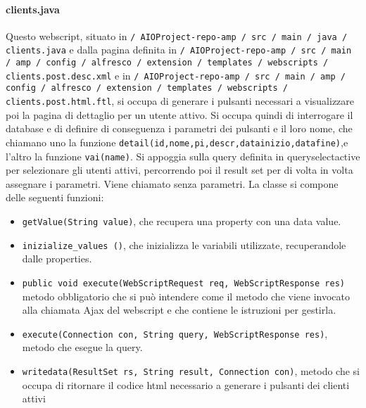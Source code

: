 \paragraph{clients.java}
Questo webscript, situato in \texttt{/ AIOProject-repo-amp / src / main / java / clients.java} e dalla pagina definita in \texttt{/ AIOProject-repo-amp / src / main / amp / config / alfresco / extension / templates / webscripts / clients.post.desc.xml} e in \texttt{/ AIOProject-repo-amp / src / main / amp / config / alfresco / extension / templates / webscripts / clients.post.html.ftl}, si occupa di generare i pulsanti necessari a visualizzare poi la pagina di dettaglio per un utente attivo. Si occupa quindi di interrogare il database e di definire di conseguenza i parametri dei pulsanti e il loro nome, che chiamano uno la funzione \texttt{detail(id,nome,pi,descr,datainizio,datafine)},e l’altro la funzione \texttt{vai(name)}. Si appoggia sulla query definita in queryselectactive per selezionare gli utenti attivi, percorrendo poi il result set per di volta in volta assegnare i parametri.
Viene chiamato senza parametri.
La classe si compone delle seguenti funzioni:
\begin{itemize}
\item \texttt{getValue(String value)}, che recupera una property con una data value.
\item \texttt{inizialize\_values ()}, che inizializza le variabili utilizzate, recuperandole dalle properties.
\item \texttt{public void execute(WebScriptRequest req, WebScriptResponse res)} metodo obbligatorio che si può intendere come il metodo che viene invocato alla chiamata Ajax del webscript e che contiene le istruzioni per gestirla.
\item \texttt{execute(Connection con, String query, WebScriptResponse res)}, metodo che esegue la query.
\item \texttt{writedata(ResultSet rs, String result, Connection con)}, metodo che si occupa di ritornare il codice html necessario a generare i pulsanti dei clienti attivi
\end{itemize}
